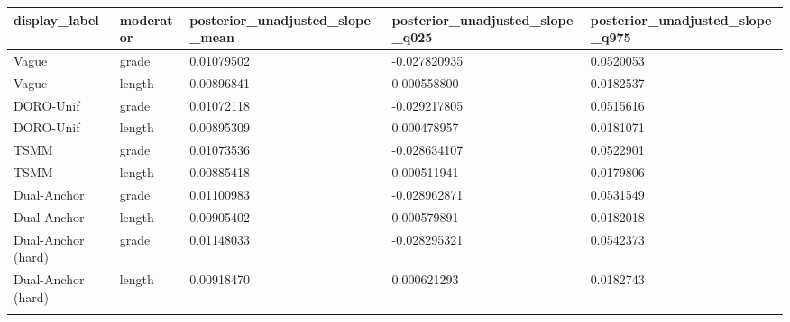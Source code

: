 \begin{longtable}{lllll}
\toprule
display\_label & moderator & posterior\_unadjusted\_slope\_mean & posterior\_unadjusted\_slope\_q025 & posterior\_unadjusted\_slope\_q975 \\
\midrule\endhead
Vague & grade & 0.01079502 & -0.027820935 & 0.0520053 \\ \addlinespace[3pt]
Vague & length & 0.00896841 & 0.000558800 & 0.0182537 \\ \addlinespace[3pt]
DORO-Unif & grade & 0.01072118 & -0.029217805 & 0.0515616 \\ \addlinespace[3pt]
DORO-Unif & length & 0.00895309 & 0.000478957 & 0.0181071 \\ \addlinespace[3pt]
TSMM & grade & 0.01073536 & -0.028634107 & 0.0522901 \\ \addlinespace[3pt]
TSMM & length & 0.00885418 & 0.000511941 & 0.0179806 \\ \addlinespace[3pt]
Dual-Anchor & grade & 0.01100983 & -0.028962871 & 0.0531549 \\ \addlinespace[3pt]
Dual-Anchor & length & 0.00905402 & 0.000579891 & 0.0182018 \\ \addlinespace[3pt]
Dual-Anchor (hard) & grade & 0.01148033 & -0.028295321 & 0.0542373 \\ \addlinespace[3pt]
Dual-Anchor (hard) & length & 0.00918470 & 0.000621293 & 0.0182743 \\ \addlinespace[3pt]
\bottomrule\end{longtable}
